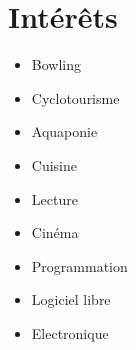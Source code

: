 \section{Intérêts}

\vspace{3mm}

\noindent
\begin{minipage}{.30\textwidth}
\raggedright
\begin{itemize}
    \item Bowling
    \item Cyclotourisme
    \item Aquaponie
\end{itemize}
\end{minipage}%
\hspace{5mm}
\begin{minipage}{.30\textwidth}
\raggedright
\begin{itemize}
    \item Cuisine
    \item Lecture
    \item Cinéma
\end{itemize}
\end{minipage}
\hspace{5mm}
\begin{minipage}{.30\textwidth}
\raggedright
\begin{itemize}
    \item Programmation
    \item Logiciel libre
    \item Electronique
\end{itemize}
\end{minipage}